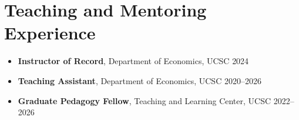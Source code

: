 \documentclass[letter,11pt]{article}
\newcommand{\dateright}[1]{\hfill{\small #1}}
\begin{document}
\section{Teaching and Mentoring Experience}
\begin{itemize}
    \item[] \textbf{Instructor of Record}, Department of Economics, UCSC \dateright{2024}
    \item[] \textbf{Teaching Assistant}, Department of Economics, UCSC \dateright{2020--2026}
        \item[] \textbf{Graduate Pedagogy Fellow}, Teaching and Learning Center, UCSC \dateright{2022--2026}

\end{itemize}
\end{document}
